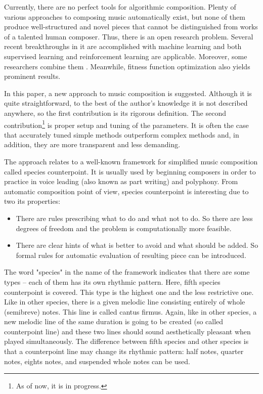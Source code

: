 \documentclass{article}
\begin{document}
Currently, there are no perfect tools for algorithmic composition. Plenty of various approaches to composing music automatically exist, but none of them produce well-structured and novel pieces that cannot be distinguished from works of a talented human composer. Thus, there is an open research problem. Several recent breakthroughs in it are accomplished with machine learning and both supervised learning \cite{johnson2017generating, payne2019musenet} and reinforcement learning \cite{yi2007automatic, smith2012reinforcement} are applicable. Moreover, some researchers combine them \cite{jaques2016generating, kotecha2018bach, kumar2019polyphonic}. Meanwhile, fitness function optimization also yields prominent results\cite{herremans2012first, herremans2013fifth}.

In this paper, a new approach to music composition is suggested. Although it is quite straightforward, to the best of the author's knowledge it is not described anywhere, so the first contribution is its rigorous definition. The second contribution\footnote{As of now, it is in progress.} is proper setup and tuning of the parameters. It is often the case that accurately tuned simple methods outperform complex methods \cite{dacrema2019are} and, in addition, they are more transparent and less demanding.

The approach relates to a well-known framework for simplified music composition called species counterpoint. It is usually used by beginning composers in order to practice in voice leading (also known as part writing) and polyphony. From automatic composition point of view, species counterpoint is interesting due to two its properties:
\begin{itemize}
	\item There are rules prescribing what to do and what not to do. So there are less degrees of freedom and the problem is computationally more feasible.
	\item There are clear hints of what is better to avoid and what should be added. So formal rules for automatic evaluation of resulting piece can be introduced.
\end{itemize}

The word "species" in the name of the framework indicates that there are some types -- each of them has its own rhythmic pattern. Here, fifth species counterpoint is covered. This type is the highest one and the less restrictive one. Like in other species, there is a given melodic line consisting entirely of whole (semibreve) notes. This line is called cantus firmus. Again, like in other species, a new melodic line of the same duration is going to be created (so called counterpoint line) and these two lines should sound aesthetically pleasant when played simultaneously. The difference between fifth species and other species is that a counterpoint line may change its rhythmic pattern: half notes, quarter notes, eights notes, and suspended whole notes can be used. 
\end{document}
